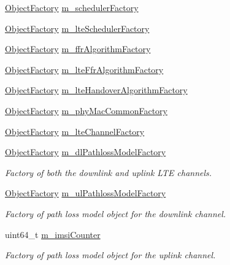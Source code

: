 \begin{DoxyCompactItemize}
\item 
\hyperlink{classns3_1_1ObjectFactory}{Object\+Factory} \hyperlink{classns3_1_1MmWaveHelper_ab42906da163580835d24bfd206242167}{m\+\_\+scheduler\+Factory}
\item 
\hyperlink{classns3_1_1ObjectFactory}{Object\+Factory} \hyperlink{classns3_1_1MmWaveHelper_af6c9cfed446ae4f664b7e046da34f69e}{m\+\_\+lte\+Scheduler\+Factory}
\item 
\hyperlink{classns3_1_1ObjectFactory}{Object\+Factory} \hyperlink{classns3_1_1MmWaveHelper_a89178d4c68df21f11ccfb66147fbdfbe}{m\+\_\+ffr\+Algorithm\+Factory}
\item 
\hyperlink{classns3_1_1ObjectFactory}{Object\+Factory} \hyperlink{classns3_1_1MmWaveHelper_a707c9644320d1406c8dafb28ddd1727e}{m\+\_\+lte\+Ffr\+Algorithm\+Factory}
\item 
\hyperlink{classns3_1_1ObjectFactory}{Object\+Factory} \hyperlink{classns3_1_1MmWaveHelper_a741c82df6a1249b8fc519a3db26913a3}{m\+\_\+lte\+Handover\+Algorithm\+Factory}
\item 
\hyperlink{classns3_1_1ObjectFactory}{Object\+Factory} \hyperlink{classns3_1_1MmWaveHelper_a6cfed1492a04a8f56ac728b8a6701f7a}{m\+\_\+phy\+Mac\+Common\+Factory}
\item 
\hyperlink{classns3_1_1ObjectFactory}{Object\+Factory} \hyperlink{classns3_1_1MmWaveHelper_a89535a1ab5d394e1796cad39e2a6637e}{m\+\_\+lte\+Channel\+Factory}
\item 
\hyperlink{classns3_1_1ObjectFactory}{Object\+Factory} \hyperlink{classns3_1_1MmWaveHelper_a7c1e9bc636d68d5d815af16e81be9ccf}{m\+\_\+dl\+Pathloss\+Model\+Factory}
\begin{DoxyCompactList}\small\item\em Factory of both the downlink and uplink L\+TE channels. \end{DoxyCompactList}\item 
\hyperlink{classns3_1_1ObjectFactory}{Object\+Factory} \hyperlink{classns3_1_1MmWaveHelper_a566de690e8d9c30e5b97335caf3fb16a}{m\+\_\+ul\+Pathloss\+Model\+Factory}
\begin{DoxyCompactList}\small\item\em Factory of path loss model object for the downlink channel. \end{DoxyCompactList}\item 
uint64\+\_\+t \hyperlink{classns3_1_1MmWaveHelper_a72100c1c951aa5dcc5b634749e2bb930}{m\+\_\+imsi\+Counter}
\begin{DoxyCompactList}\small\item\em Factory of path loss model object for the uplink channel. \end{DoxyCompactList}\item 

\end{DoxyCompactItemize}
